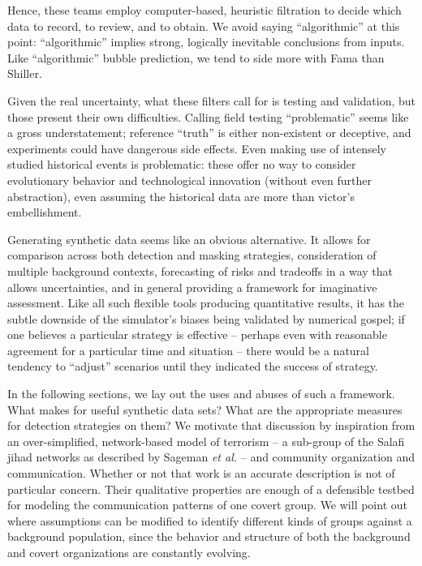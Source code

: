 \documentclass{article}
\begin{document}
Hence, these teams employ computer-based, heuristic filtration to decide which data to record, to review, and to obtain.  We avoid saying ``algorithmic'' at this point: ``algorithmic'' implies strong, logically inevitable conclusions from inputs.  Like ``algorithmic'' bubble prediction, we tend to side more with Fama than Shiller.

Given the real uncertainty, what these filters call for is testing and validation, but those present their own difficulties.  Calling field testing ``problematic'' seems like a gross understatement; reference ``truth'' is either non-existent or deceptive, and experiments could have dangerous side effects.  Even making use of intensely studied historical events is problematic: these offer no way to consider evolutionary behavior and technological innovation (without even further abstraction), even assuming the historical data are more than victor's embellishment.

Generating synthetic data seems like an obvious alternative.  It allows for comparison across both detection and masking strategies, consideration of multiple background contexts, forecasting of risks and tradeoffs in a way that allows uncertainties, and in general providing a framework for imaginative assessment.  Like all such flexible tools producing quantitative results, it has the subtle downside of the simulator's biases being validated by numerical gospel; if one believes a particular strategy is effective -- perhaps even with reasonable agreement for a particular time and situation -- there would be a natural tendency to ``adjust'' scenarios until they indicated the success of strategy.

In the following sections, we lay out the uses and abuses of such a framework.  What makes for useful synthetic data sets?  What are the appropriate measures for detection strategies on them?  We motivate that discussion by inspiration from an over-simplified, network-based model of terrorism -- a sub-group of the Salafi jihad networks as described by Sageman {\em et al.}\cite{sageman} -- and community organization and communication.  Whether or not that work is an accurate description is not of particular concern.  Their qualitative properties are enough of a defensible testbed for modeling the communication patterns of one covert group.  We will point out where assumptions can be modified to identify different kinds of groups against a background population, since the behavior and structure of both the background and covert organizations are constantly evolving. 
\end{document}
